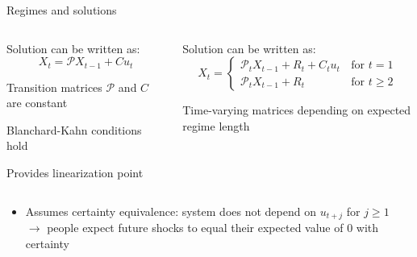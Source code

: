 \begin{frame}{Regimes and solutions}
\begin{columns}[T]
\begin{wideitemize}
    \item Solution can be written as:
        \begin{equation}\label{eq:M1DR}
        X_t = \mathcal{P}X_{t-1} + Cu_t \tag{M1DR}
        \end{equation}
        \item Transition matrices $\mathcal{P}$ and $C$ are constant
        \item Blanchard-Kahn conditions hold
        \item Provides linearization point
\end{wideitemize}
\begin{wideitemize}
    \item  Solution   can be written as:
    \begin{equation}\label{eq:M2DR}
        X_t =
            \begin{cases}
            \mathcal{P}_{t}X_{t-1} + R_t + C_tu_t \, &\text{for } t = 1 \\
              \mathcal{P}_tX_{t-1} + R_t \, &\text{for } t \geq 2
            \end{cases}
            \tag{M2DR}
        \end{equation}
        \item Time-varying matrices depending on expected regime length
\end{wideitemize}
\end{columns}
\vspace{1cm}
\begin{itemize}
\item Assumes certainty equivalence: system does not depend on $u_{t+j}$ for $j \geq 1$\\
$\rightarrow$ people expect future shocks to equal their expected value of 0 with certainty
\end{itemize}
\end{frame}

